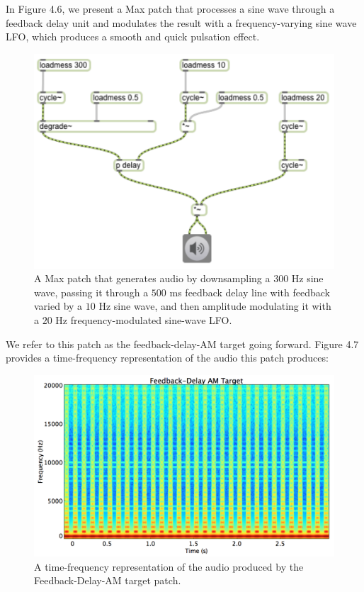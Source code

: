 \documentclass[12pt]{report} 	%
\numberwithin{figure}{chapter}
\numberwithin{table}{chapter}
\numberwithin{equation}{chapter}
\begin{document}
\begin{flushleft}
In Figure 4.6, we present a Max patch that processes a sine wave through a feedback delay unit and modulates the result with a frequency-varying sine wave LFO, which produces a smooth and quick pulsation effect.
\begin{figure}[h!]
\begin{center}
\includegraphics[scale=0.8]{DelayFeedbackAM}
\caption[Delay feedback AM Max patch]{A Max patch that generates audio by downsampling a $300$ Hz sine wave, passing it through a $500$ ms feedback delay line with feedback varied by a $10$ Hz sine wave, and then amplitude modulating it with a $20$ Hz frequency-modulated sine-wave LFO.}
\end{center}
\end{figure}
We refer to this patch as the feedback-delay-AM target going forward. Figure 4.7 provides a time-frequency representation of the audio this patch produces:
\begin{figure}[h!]
\begin{center}
\includegraphics[width=\linewidth]{FeedbackDelayAMTargetSTFT}
\caption[Delay feedback AM time-frequency representation]{A time-frequency representation of the audio produced by the Feedback-Delay-AM target patch.}
\end{center}
\end{figure}


\end{flushleft}
\end{document}
